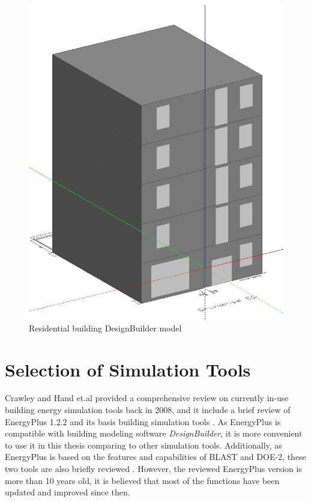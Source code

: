 \documentclass[a4paper, oneside]{discothesis}
\begin{document}
			\begin{figure}[H]
			\centering
			\includegraphics[scale=0.4]{HonggDesignBuilderModel.JPG}
			\caption{Residential building DesignBuilder model}
			\label{fig:HonggDB}
			\end{figure}


	\section{Selection of Simulation Tools}
		Crawley and Hand et.al provided a comprehensive review on currently in-use building energy simulation tools back in 2008, and it include a brief review of EnergyPlus 1.2.2 and its basis building simulation tools \cite{crawley2008contrasting}. As EnergyPlus is compatible with building modeling software \textit{DesignBuilder}, it is more convenient to use it in this thesis comparing to other simulation tools. Additionally, as EnergyPlus is based on the features and capabilities of BLAST and DOE-2, these two tools are also briefly reviewed \cite{crawley2008contrasting}. However, the reviewed EnergyPlus version is more than 10 years old, it is believed that most of the functions have been updated and improved since then. \\
\end{document}
